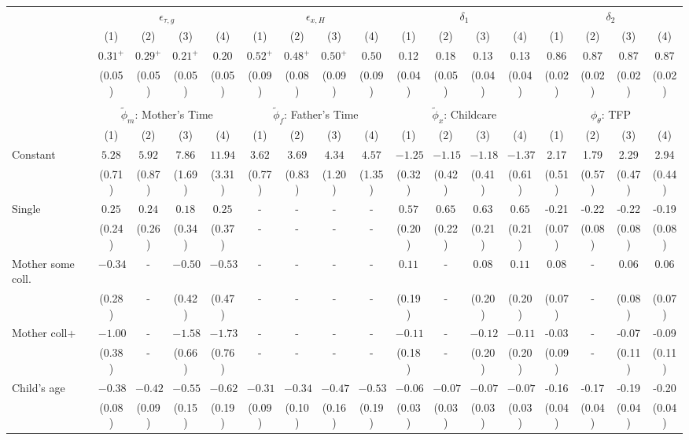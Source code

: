 \begin{tabular}{lcccccccccccccccc}\\\toprule
 & \multicolumn{4}{c}{$\epsilon_{\tau,g}$} & \multicolumn{4}{c}{$\epsilon_{x,H}$} & \multicolumn{4}{c}{$\delta_{1}$} & \multicolumn{4}{c}{$\delta_{2}$} \\
&(1)&(2)&(3)&(4)&(1)&(2)&(3)&(4)&(1)&(2)&(3)&(4)&(1)&(2)&(3)&(4)\\\cmidrule(r){2-5}\cmidrule(r){6-9}\cmidrule(r){10-13}\cmidrule(r){14-17}
&$0.31^{+}$&$0.29^{+}$&$0.21^{+}$&$0.20$&$0.52^{+}$&$0.48^{+}$&$0.50^{+}$&$0.50$&0.12&0.18&0.13&0.13&0.86&0.87&0.87&0.87\\
&(0.05)&(0.05)&(0.05)&(0.05)&(0.09)&(0.08)&(0.09)&(0.09)&(0.04)&(0.05)&(0.04)&(0.04)&(0.02)&(0.02)&(0.02)&(0.02)\\
&&&&&&&&&&&&&&&&\\
 & \multicolumn{4}{c}{$\tilde{\phi}_{m}$: Mother's Time} & \multicolumn{4}{c}{$\tilde{\phi}_{f}$: Father's Time} & \multicolumn{4}{c}{$\tilde{\phi}_{x}$: Childcare} & \multicolumn{4}{c}{$\phi_{\theta}$: TFP} \\
&(1)&(2)&(3)&(4)&(1)&(2)&(3)&(4)&(1)&(2)&(3)&(4)&(1)&(2)&(3)&(4)\\\cmidrule(r){2-5}\cmidrule(r){6-9}\cmidrule(r){10-13}\cmidrule(r){14-17}
Constant&$5.28$&$5.92$&$7.86$&$11.94$&$3.62$&$3.69$&$4.34$&$4.57$&$-1.25$&$-1.15$&$-1.18$&$-1.37$&2.17&1.79&2.29&2.94\\
&(0.71)&(0.87)&(1.69)&(3.31)&(0.77)&(0.83)&(1.20)&(1.35)&(0.32)&(0.42)&(0.41)&(0.61)&(0.51)&(0.57)&(0.47)&(0.44)\\
Single&$0.25$&$0.24$&$0.18$&$0.25$&-&-&-&-&$0.57$&$0.65$&$0.63$&$0.65$&-0.21&-0.22&-0.22&-0.19\\
&(0.24)&(0.26)&(0.34)&(0.37)&-&-&-&-&(0.20)&(0.22)&(0.21)&(0.21)&(0.07)&(0.08)&(0.08)&(0.08)\\
Mother some coll.&$-0.34$&-&$-0.50$&$-0.53$&-&-&-&-&$0.11$&-&$0.08$&$0.11$&0.08&-&0.06&0.06\\
&(0.28)&-&(0.42)&(0.47)&-&-&-&-&(0.19)&-&(0.20)&(0.20)&(0.07)&-&(0.08)&(0.07)\\
Mother coll+&$-1.00$&-&$-1.58$&$-1.73$&-&-&-&-&$-0.11$&-&$-0.12$&$-0.11$&-0.03&-&-0.07&-0.09\\
&(0.38)&-&(0.66)&(0.76)&-&-&-&-&(0.18)&-&(0.20)&(0.20)&(0.09)&-&(0.11)&(0.11)\\
Child's age&$-0.38$&$-0.42$&$-0.55$&$-0.62$&$-0.31$&$-0.34$&$-0.47$&$-0.53$&$-0.06$&$-0.07$&$-0.07$&$-0.07$&-0.16&-0.17&-0.19&-0.20\\
&(0.08)&(0.09)&(0.15)&(0.19)&(0.09)&(0.10)&(0.16)&(0.19)&(0.03)&(0.03)&(0.03)&(0.03)&(0.04)&(0.04)&(0.04)&(0.04)\\

\end{tabular}
